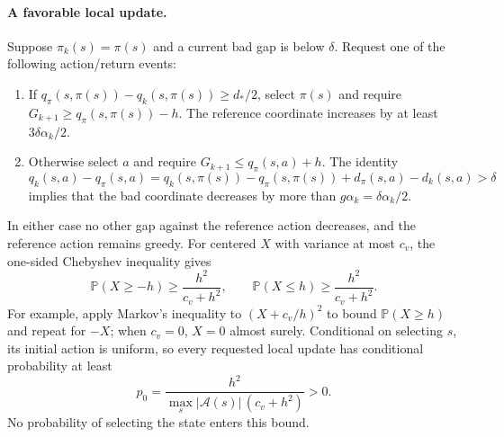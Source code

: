 \paragraph{A favorable local update.}
Suppose $\pi_k(s)=\pi(s)$ and a current
bad gap is below $\delta$. Request one of the following action/return events:
\begin{enumerate}
\item If $q_\pi(s,\pi(s))-q_k(s,\pi(s))\ge d_*/2$, select $\pi(s)$ and require $G_{k+1}\ge q_\pi(s,\pi(s))-h$. The
reference coordinate increases by at least $3\delta\alpha_k/2$.
\item Otherwise select $a$ and require $G_{k+1}\le q_\pi(s,a)+h$. The identity
\[
q_k(s,a)-q_\pi(s,a)=q_k(s,\pi(s))-q_\pi(s,\pi(s))+d_\pi(s,a)-d_k(s,a)>\delta
\]
implies that the bad coordinate decreases by more than $g\alpha_k=\delta\alpha_k/2$.
\end{enumerate}
In either case no other gap against the reference action decreases, and the reference action
remains greedy. For centered $X$ with variance at most $c_v$, the one-sided Chebyshev inequality
gives
\[
\mathbb P(X\ge-h)\ge\frac{h^2}{c_v+h^2},\qquad
\mathbb P(X\le h)\ge\frac{h^2}{c_v+h^2}.
\]
For example, apply Markov's inequality to $(X+c_v/h)^2$ to bound $\mathbb P(X\ge h)$ and repeat for
$-X$; when $c_v=0$, $X=0$ almost surely. Conditional on selecting $s$, its initial action is
uniform, so every requested local update has conditional probability at least
\begin{equation}\label{eq:localprob}
p_0=\frac{h^2}{\max_s|\mathcal A(s)|\,(c_v+h^2)}>0.
\end{equation}
No probability of selecting the state enters this bound.


